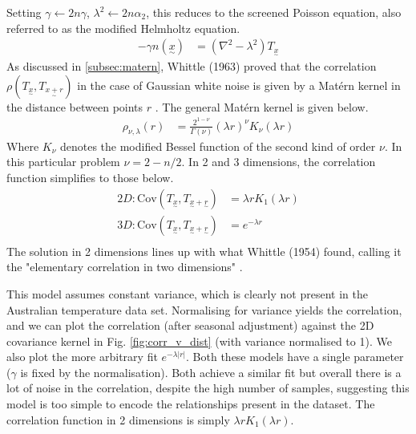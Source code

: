 \documentclass[12pt,a4paper]{article} %
\newcommand{\ve}[1]{\underset{\sim}{#1}}
\begin{document}
Setting $\gamma\leftarrow 2n\gamma$, $\lambda^2\leftarrow 2n\alpha_2$, this reduces to the screened Poisson equation, also referred to as the modified Helmholtz equation.
\begin{align*}
    -\gamma n(\ve{x})&=(\nabla^2-\lambda^2)T_{\ve{x}}
\end{align*}
As discussed in \ref{subsec:matern}, Whittle (1963) proved that the correlation $\rho(T_{\ve{x}},T_{\ve{x+r}})$ in the case of Gaussian white noise is given by a Mat\'{e}rn kernel in the distance between points $r$ \cite{whittle}. The general Mat\'{e}rn kernel is given below.
\begin{align*}
    \rho_{\nu,\lambda}(r)&=\frac{2^{1-\nu}}{\Gamma(\nu)}(\lambda r)^\nu K_\nu(\lambda r)
\end{align*}
Where $K_\nu$ denotes the modified Bessel function of the second kind of order $\nu$. In this particular problem $\nu=2-n/2$. In 2 and 3 dimensions, the correlation function simplifies to those below.
\begin{align*}
    2D:\text{Cov}(T_{\ve{x}},T_{\ve{x}+\ve{r}})&=\lambda rK_1(\lambda r)\\
    3D:\text{Cov}(T_{\ve{x}},T_{\ve{x}+\ve{r}})&=e^{-\lambda r}\\
\end{align*}
The solution in 2 dimensions lines up with what Whittle (1954) found, calling it the "elementary correlation in two dimensions" \cite{whittle2}. 


This model assumes constant variance, which is clearly not present in the Australian temperature data set. Normalising for variance yields the correlation, and we can plot the correlation (after seasonal adjustment) against the 2D covariance kernel in Fig. \ref{fig:corr_v_dist} (with variance normalised to 1). We also plot the more arbitrary fit $e^{-\lambda|r|}$. Both these models have a single parameter ($\gamma$ is fixed by the normalisation). Both achieve a similar fit but overall there is a lot of noise in the correlation, despite the high number of samples, suggesting this model is too simple to encode the relationships present in the dataset. The correlation function in 2 dimensions is simply $\lambda rK_1(\lambda r)$.
\end{document}
